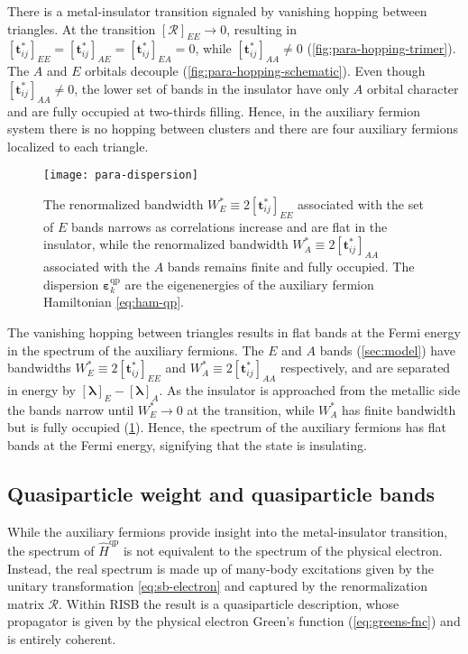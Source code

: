 \documentclass[reprint,aps,prb,amsmath,amssymb]{revtex4-2}
\begin{document}
There is a metal-insulator transition signaled by vanishing hopping between triangles. At the transition $[\bm{\mathcal{R}}]_{EE} \rightarrow 0$, resulting in $[\bm{t}_{ij}^*]_{EE} = [\bm{t}_{ij}^*]_{AE} = [\bm{t}_{ij}^*]_{EA} = 0$, while $[\bm{t}_{ij}^*]_{AA} \neq 0$ (\cref{fig:para-hopping-trimer}). The $A$ and $E$ orbitals decouple (\cref{fig:para-hopping-schematic}). Even though $[\bm{t}_{ij}^*]_{AA} \neq 0$, the lower set of bands in the insulator have only $A$ orbital character and are fully occupied at two-thirds filling. Hence, in the auxiliary fermion system there is no hopping between clusters and there are four auxiliary fermions localized to each triangle.

\begin{figure}
	\centering
	\texttt{[image: para-dispersion]}
	\caption{\label{fig:para-dipersion}
	The renormalized bandwidth $W_E^* \equiv 2 [\bm{t}_{ij}^*]_{EE}$ associated with the set of $E$ bands narrows as correlations increase and are flat in the insulator, while the renormalized bandwidth $W_A^* \equiv 2 [\bm{t}_{ij}^*]_{AA}$ associated with the $A$ bands remains finite and fully occupied. The dispersion $\bm{\varepsilon}_k^{\mathrm{qp}}$ are the eigenenergies of the auxiliary fermion Hamiltonian \cref{eq:ham-qp}.
	}
\end{figure}

The vanishing hopping between triangles results in flat bands at the Fermi energy in the spectrum of the auxiliary fermions. The $E$ and $A$ bands (\cref{sec:model}) have bandwidths $W_E^* \equiv 2[\bm{t}_{ij}^*]_{EE}$ and $W_A^* \equiv 2[\bm{t}_{ij}^*]_{AA}$ respectively, and are separated in energy by $[\bm{\lambda}]_{E} - [\bm{\lambda}]_{A}$. As the insulator is approached from the metallic side the bands narrow until $W_E^* \rightarrow 0$ at the transition, while $W_{A}^*$ has finite bandwidth but is fully occupied (\cref{fig:para-dipersion}). Hence, the spectrum of the auxiliary fermions has flat bands at the Fermi energy, signifying that the state is insulating.

\subsection{Quasiparticle weight and quasiparticle bands} \label{sec:quasiparticle-bands}

While the auxiliary fermions provide insight into the metal-insulator transition, the spectrum of $\hat{H}^{\mathrm{qp}}$ is not equivalent to the spectrum of the physical electron. Instead, the real spectrum is made up of many-body excitations given by the unitary transformation \cref{eq:sb-electron} and captured by the renormalization matrix $\bm{\mathcal{R}}$. Within RISB the result is a quasiparticle description, whose propagator is given by the physical electron Green's function (\cref{eq:greens-fnc}) and is entirely coherent.
\end{document}
